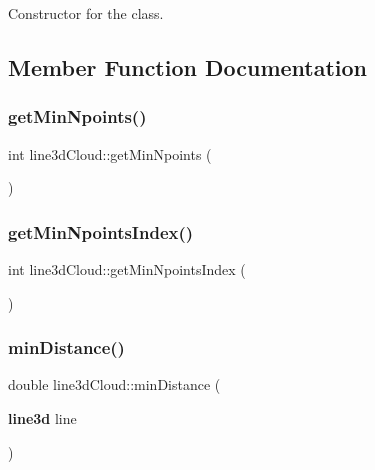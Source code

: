 Constructor for the class. 



\subsection{Member Function Documentation}
\mbox{\label{classline3d_cloud_aa6879344baded87a3d10858536534b7c}} 
\subsubsection{get\+Min\+Npoints()}
{\footnotesize\ttfamily int line3d\+Cloud\+::get\+Min\+Npoints (\begin{DoxyParamCaption}{ }\end{DoxyParamCaption})}

\mbox{\label{classline3d_cloud_a99ff4321bff42c81a30e86296f22035b}} 
\subsubsection{get\+Min\+Npoints\+Index()}
{\footnotesize\ttfamily int line3d\+Cloud\+::get\+Min\+Npoints\+Index (\begin{DoxyParamCaption}{ }\end{DoxyParamCaption})}

\mbox{\label{classline3d_cloud_a85d6b989211a90a63f13633cb7e4164e}} 
\subsubsection{min\+Distance()\hspace{0.1cm}{\footnotesize\ttfamily [1/2]}}
{\footnotesize\ttfamily double line3d\+Cloud\+::min\+Distance (\begin{DoxyParamCaption}\item[{\textbf{ line3d}}]{line }\end{DoxyParamCaption})}

\mbox{\label{classline3d_cloud_aefc75565b96d9580ea8d5d60266ac0f4}} 
